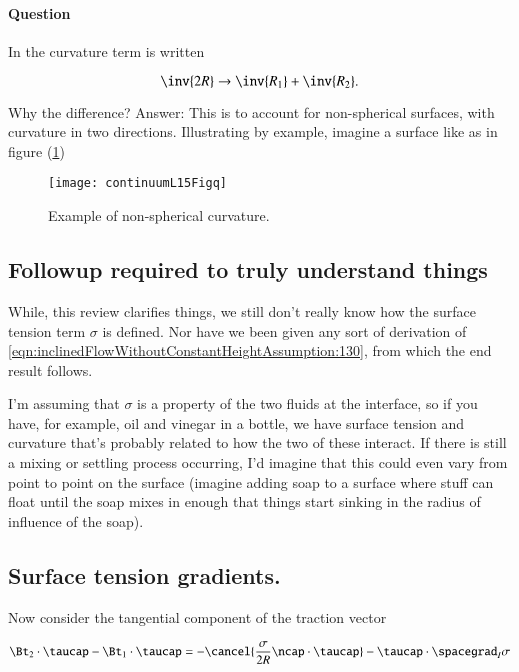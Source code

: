\paragraph{Question} In \cite{landau1987course} the curvature term is written

\begin{equation}\label{eqn:inclinedFlowWithoutConstantHeightAssumption:70}
\inv{2 R} \rightarrow \inv{R_1} + \inv{R_2}.
\end{equation}

Why the difference?  Answer: This is to account for non-spherical surfaces, with curvature in two directions.  Illustrating by example, imagine a surface like as in figure (\ref{fig:continuumL15:continuumL15Figq})
\begin{figure}[htp]
   \centering
   \texttt{[image: continuumL15Figq]}
   \caption{Example of non-spherical curvature.}\label{fig:continuumL15:continuumL15Figq}
\end{figure}

\subsection{Followup required to truly understand things}

While, this review clarifies things, we still don't really know how the surface tension term $\sigma$ is defined.  Nor have we been given any sort of derivation of \ref{eqn:inclinedFlowWithoutConstantHeightAssumption:130}, from which the end result follows.

I'm assuming that $\sigma$ is a property of the two fluids at the interface, so if you have, for example, oil and vinegar in a bottle, we have surface tension and curvature that's probably related to how the two of these interact.  If there is still a mixing or settling process occurring, I'd imagine that this could even vary from point to point on the surface (imagine adding soap to a surface where stuff can float until the soap mixes in enough that things start sinking in the radius of influence of the soap).

\subsection{Surface tension gradients.}

Now consider the tangential component of the traction vector

\begin{equation}\label{eqn:inclinedFlowWithoutConstantHeightAssumption:90}
\Bt_2 \cdot \taucap - \Bt_1 \cdot \taucap = - \cancel{ \frac{\sigma}{2 R} \ncap \cdot \taucap} - \taucap \cdot \spacegrad_I \sigma
\end{equation}

